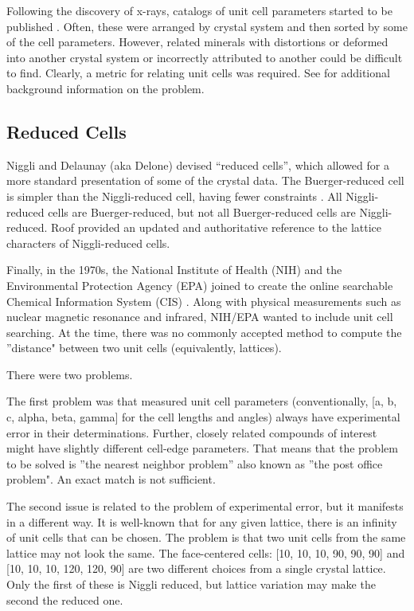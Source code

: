 \documentclass[preprint]{iucr}              %
\begin{document}
Following the discovery of x-rays, 
catalogs of unit cell parameters started to be published \cite{wyckoff1931}.
Often, these were arranged by crystal system and then sorted by some of the cell parameters. However, related minerals with distortions or deformed into another crystal system or incorrectly attributed to another could be difficult to find. Clearly, a metric for relating unit cells was required.  See \cite{Andrews2023} for additional
background information on the problem.

\subsection{Reduced Cells}

Niggli \cite{Niggli1928} and Delaunay \cite{Delaunay1933} (aka Delone) devised ``reduced cells'', which allowed for a more standard presentation of some of the crystal data.
The Buerger-reduced cell is simpler than the Niggli-reduced cell, having fewer
constraints \cite{Buerger1957} \cite{Azaroff1958} \cite{Buerger1960}.  All Niggli-reduced cells are Buerger-reduced, but not all Buerger-reduced cells are Niggli-reduced.  Roof \cite{Roof1967} provided an updated and authoritative reference to the lattice characters of Niggli-reduced cells.


Finally, in the 1970s, the National Institute of Health (NIH) and the Environmental Protection Agency (EPA) joined to create the online searchable Chemical Information System (CIS) \cite{Heller1976} \cite{Bernstein1979}.
Along with physical measurements such as nuclear magnetic resonance and infrared, NIH/EPA wanted to include unit cell searching. At the time, there was no commonly accepted method to compute the ''distance" between two unit cells (equivalently, lattices).  

There were two problems.
	
The first problem was that measured unit cell parameters (conventionally, [a, b, c, alpha, beta, gamma]  for the cell lengths and angles) always have experimental error in their determinations.  Further, closely related compounds of interest might have slightly different cell-edge parameters.  That means that the problem to be solved is ''the nearest neighbor problem” also known as ''the post office problem". An exact match is not sufficient.

The second issue is related to the problem of experimental error, but it manifests in a different way. It is well-known that for any given lattice, there is an infinity of unit cells that can be chosen.  The problem is that two unit cells from the same lattice  may not look the same.  The face-centered cells: [10, 10, 10, 90, 90, 90]  and [10, 10, 10, 120, 120, 90] are two different choices from a single crystal lattice.  Only the first of these is Niggli reduced, but lattice variation may make the second the reduced one.
\end{document}
